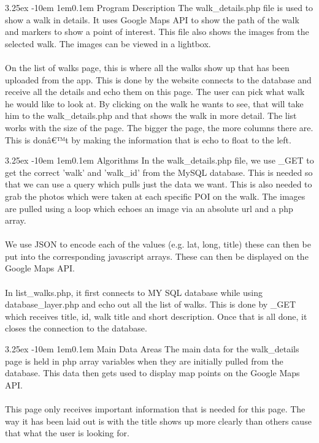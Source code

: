 \documentclass[12pt]{article}
\makeatletter
\renewcommand{\paragraph}{
  \@startsection{paragraph}{4}
  {\z@}{3.25ex \@plus -10em \@minus 1em}{0.1em}
  {\normalfont\normalsize\bfseries}
}
\makeatother
\begin{document}
\paragraph{Program Description} 
The walk\_details.php file is used to show a walk in details. It uses Google Maps API to show the path of the walk and markers to show a point of interest. This file also shows the images from the selected walk. The images can be viewed in a lightbox.
~\\\\
On the list of walks page, this is where all the walks show up that has been uploaded from the app. This is done by the website connects to the database and receive all the details and echo them on this page. The user can pick what walk he would like to look at. By clicking on the walk he wants to see, that will take him to the walk\_details.php and that shows the walk in more detail.  The list works with the size of the page. The bigger the page, the more columns there are. This is donâ€™t by making the information that is echo to float to the left.

\paragraph{Algorithms}
In the walk\_details.php file, we use \textdollar\_GET to get the correct 'walk' and 'walk\_id' from the MySQL database. This is needed so that we can use a query which pulls just the data we want. This is also needed to grab the photos which were taken at each specific POI on the walk. The images are pulled using a loop which echoes an image via an absolute url and a php array.
~\\\\
We use JSON to encode each of the values (e.g. \textdollar lat, \textdollar long, \textdollar title) these can then be put into the corresponding javascript arrays. These can then be displayed on the Google Maps API. 
~\\\\
In list\_walks.php, it first connects to MY SQL database while using \newline database\_layer.php and echo out all the list of walks. This is done by \textdollar\_GET which receives title, id, walk title and short description. Once that is all done, it closes the connection to the database.
\paragraph{Main Data Areas}
The main data for the walk\_details page is held in php array variables when they are initially pulled from the database. This data then gets used to display map points on the Google Maps API.
~\\\\
This page only receives important information that is needed for this page.  The way it has been laid out is with the title shows up more clearly than others cause that what the user is looking for.
\end{document}
